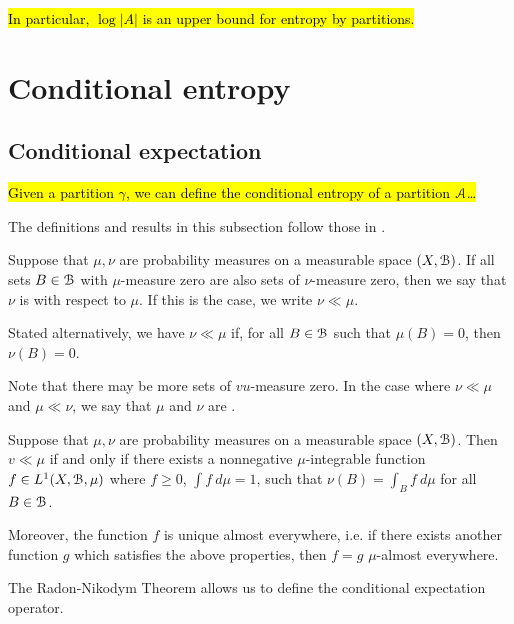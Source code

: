 \hl{In particular, $\log{|A|}$ is an upper bound for entropy by partitions.}

\section{Conditional entropy}
\subsection{Conditional expectation}
\hl{Given a partition $\gamma$, we can define the conditional entropy of a partition $\mathcal{A}$\dots}

The definitions and results in this subsection follow those in \cite[p8-9]{walters:intro-to-ergodic-theory}.
\begin{definition}
	Suppose that $\mu, \nu$ are probability measures on a measurable space $(X, \mathcal{B})$. If all sets $B \in \mathcal{B}$ with $\mu$-measure zero are also sets of $\nu$-measure zero, then we say that $\nu$ is  with respect to $\mu$. If this is the case, we write $\nu \ll \mu$.
	
	Stated alternatively, we have $\nu \ll \mu$ if, for all $B \in \mathcal{B}$ such that $\mu(B) = 0$, then $\nu(B) = 0$.
	
	Note that there may be more sets of $vu$-measure zero. In the case where $\nu \ll \mu$ and $\mu \ll \nu$, we say that $\mu$ and $\nu$ are .
\end{definition}

\begin{theorem} \label{thm:radon-nikodym}
	Suppose that $\mu, \nu$ are probability measures on a measurable space $(X, \mathcal{B})$. Then $v \ll \mu$ if and only if there exists a nonnegative $\mu$-integrable function $f \in L^1(X, \mathcal{B}, \mu)$ where $f \geq 0$, $\int{f\ d\mu} = 1$, such that $\nu(B) = \int_B{f\ d\mu}$ for all $B \in \mathcal{B}$.
	
	Moreover, the function $f$ is unique almost everywhere, i.e. if there exists another function $g$ which satisfies the above properties, then $f = g$ $\mu$-almost everywhere.
\end{theorem}

The Radon-Nikodym Theorem allows us to define the conditional expectation operator.

